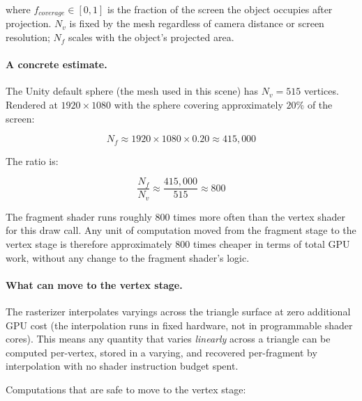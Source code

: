 \documentclass[11pt]{article}
\begin{document}
where $f_{coverage} \in [0, 1]$ is the fraction of the screen the object occupies after projection. $N_v$ is fixed by the mesh regardless of camera distance or screen resolution; $N_f$ scales with the object's projected area.

\paragraph{A concrete estimate.}

The Unity default sphere (the mesh used in this scene) has $N_v = 515$ vertices. Rendered at $1920 \times 1080$ with the sphere covering approximately $20\%$ of the screen:

\begin{equation}
    N_f \approx 1920 \times 1080 \times 0.20 \approx 415{,}000
\end{equation}

The ratio is:

\begin{equation}
    \frac{N_f}{N_v} \approx \frac{415{,}000}{515} \approx 800
\end{equation}

The fragment shader runs roughly 800 times more often than the vertex shader for this draw call. Any unit of computation moved from the fragment stage to the vertex stage is therefore approximately 800 times cheaper in terms of total GPU work, without any change to the fragment shader's logic.

\paragraph{What can move to the vertex stage.}

The rasterizer interpolates varyings across the triangle surface at zero additional GPU cost (the interpolation runs in fixed hardware, not in programmable shader cores). This means any quantity that varies \emph{linearly} across a triangle can be computed per-vertex, stored in a varying, and recovered per-fragment by interpolation with no shader instruction budget spent.

Computations that are safe to move to the vertex stage:
\end{document}
